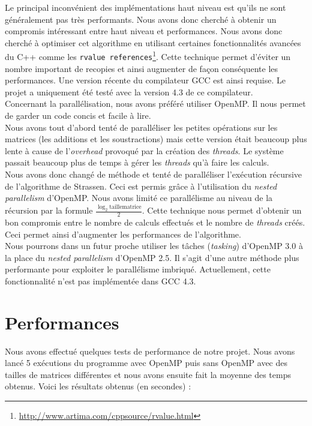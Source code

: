\documentclass[a4paper, 12pt]{article}
\begin{document}
Le principal inconvénient des implémentations haut niveau est qu'ils
ne sont généralement pas très performants. Nous avons donc cherché à
obtenir un compromis intéressant entre haut niveau et performances.
Nous avons donc cherché à optimiser cet algorithme en utilisant
certaines fonctionnalités avancées du C++ comme les \texttt{rvalue
  references}\footnote{\url{http://www.artima.com/cppsource/rvalue.html}}.
Cette technique permet d'éviter un nombre important de recopies et
ainsi augmenter de façon conséquente les performances. Une version
récente du compilateur GCC est ainsi requise. Le projet a uniquement
été testé avec la version 4.3 de ce compilateur. \\

Concernant la parallélisation, nous avons préféré utiliser OpenMP. Il
nous permet de garder un code concis et facile à lire. \\

Nous avons tout d'abord tenté de paralléliser les petites opérations
sur les matrices (les additions et les soustractions) mais cette
version était beaucoup plus lente à cause de l'\textit{overhead}
provoqué par la création des \textit{threads}. Le système passait
beaucoup plus de temps à gérer les \textit{threads} qu'à faire les calculs. \\

Nous avons donc changé de méthode et tenté de paralléliser l'exécution
récursive de l'algorithme de Strassen. Ceci est permis grâce à
l'utilisation du \textit{nested parallelism} d'OpenMP. Nous avons
limité ce parallélisme au niveau de la récursion par la formule $
\frac{\log_2 \mathrm{taillematrice}}{2} $. Cette technique nous permet
d'obtenir un bon compromis entre le nombre de calculs effectués et le
nombre de \textit{threads} créés. Ceci permet ainsi d'augmenter les
performances de l'algorithme. \\

Nous pourrons dans un futur proche utiliser les tâches
(\textit{tasking}) d'OpenMP 3.0 à la place du \textit{nested
  parallelism} d'OpenMP 2.5. Il s'agit d'une autre méthode plus
performante pour exploiter le parallélisme imbriqué. Actuellement,
cette fonctionnalité n'est pas implémentée dans GCC 4.3.

\pagebreak

\section{Performances}

Nous avons effectué quelques tests de performance de notre projet.
Nous avons lancé 5 exécutions du programme avec OpenMP puis sans
OpenMP avec des tailles de matrices différentes et nous avons ensuite
fait la moyenne des temps obtenus. Voici les résultats obtenus (en
secondes) :
\end{document}
